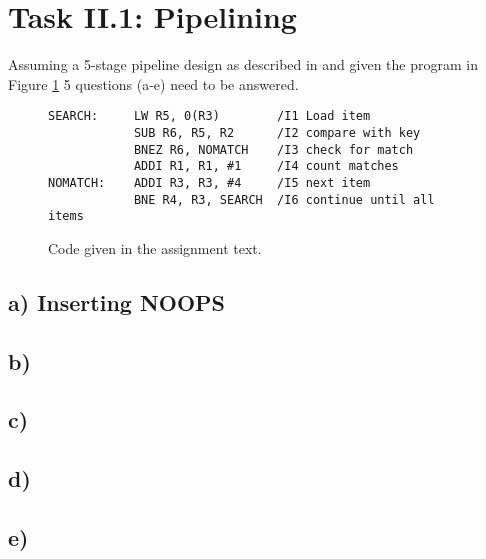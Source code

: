 \section{Task II.1: Pipelining}

Assuming a 5-stage pipeline design as described in \cite{l3InOrder} and given
the program in Figure \ref{fig:t21code} 5 questions (a-e) need to be answered.

\begin{figure}[ht]
    \begin{lstlisting}[language={[x86masm]Assembler}]
SEARCH:     LW R5, 0(R3)        /I1 Load item
            SUB R6, R5, R2      /I2 compare with key
            BNEZ R6, NOMATCH    /I3 check for match
            ADDI R1, R1, #1     /I4 count matches
NOMATCH:    ADDI R3, R3, #4     /I5 next item
            BNE R4, R3, SEARCH  /I6 continue until all items
    \end{lstlisting}
    \caption{Code given in the assignment text.}
    \label{fig:t21code}
\end{figure}

\subsection{a) Inserting NOOPS}


\subsection{b)}
\subsection{c)}
\subsection{d)}
\subsection{e)}

